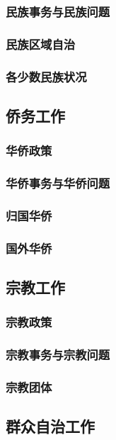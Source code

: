 \documentclass[UTF8]{../RepresentationUniverse}
\begin{document}
    \subsubsection{民族事务与民族问题}
    \subsubsection{民族区域自治}
    \subsubsection{各少数民族状况}

\subsection{侨务工作}
    \subsubsection{华侨政策}
    \subsubsection{华侨事务与华侨问题}
    \subsubsection{归国华侨}
    \subsubsection{国外华侨}

\subsection{宗教工作}
    \subsubsection{宗教政策}
    \subsubsection{宗教事务与宗教问题}
    \subsubsection{宗教团体}

\subsection{群众自治工作}
\end{document}
